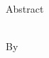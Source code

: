 
\begin{singlespace}
    \begin{center}
        Abstract 
        
        \bigskip
        
        \mytitle \\
        By \myname
    
    \end{center}

    \bigskip
    
    \noindent \lipsum[1-2]
    
\end{singlespace}
\newpage
